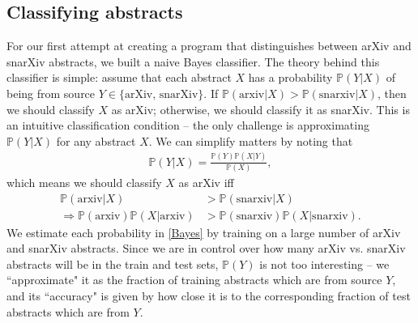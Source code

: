\documentclass{article}
\renewcommand{\P}{\mathbb{P}}
\begin{document}
\subsection{Classifying abstracts}
For our first attempt at creating a program that distinguishes between arXiv and snarXiv abstracts, we built a naive Bayes classifier.
The theory behind this classifier is simple:
assume that each abstract $X$ has a probability $\P(Y|X)$ of being from source $Y\in\{\text{arXiv, snarXiv}\}$.
If $\P(\text{arxiv}|X) > \P(\text{snarxiv}|X)$, then we should classify $X$ as arXiv; otherwise, we should classify it as snarXiv.
This is an intuitive classification condition -- the only challenge is approximating $\P(Y|X)$ for any abstract $X$.
We can simplify matters by noting that
\begin{align}
  \P(Y|X) = \frac{\P(Y)\P(X|Y)}{\P(X)},
\end{align}
which means we should classify $X$ as arXiv iff
\begin{align}
  \P(\text{arxiv}|X) &> \P(\text{snarxiv}|X)  \\
  \Rightarrow \P(\text{arxiv})\P(X|\text{arxiv}) &> \P(\text{snarxiv})\P(X|\text{snarxiv}). \label{Bayes}
\end{align}
We estimate each probability in \eqref{Bayes} by training on a large number of arXiv and snarXiv abstracts.
Since we are in control over how many arXiv vs. snarXiv abstracts will be in the train and test sets, $\P(Y)$ is not too interesting -- we ``approximate" it as the fraction of training abstracts which are from source $Y$, and its ``accuracy" is given by how close it is to the corresponding fraction of test abstracts which are from $Y$.
\end{document}
